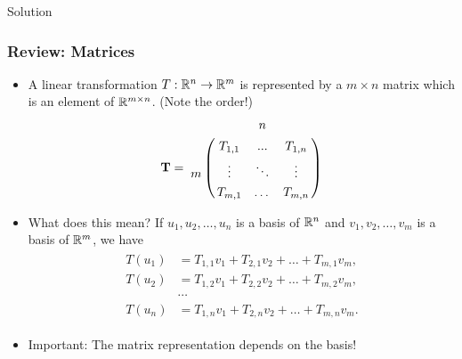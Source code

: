 \documentclass{beamer}
\begin{document}
\begin{frame}[t]{Solution}
	\grid
	\pause
	\pause
\end{frame}

\begin{frame}[t]
	\frametitle{Review: Matrices}
	\begin{itemize}
	\fonttwelve
\item A linear transformation $ T: \mathbb{R}^n \to \mathbb{R}^m$ is represented by a $m \times n $ matrix
which is an element of $\mathbb{R}^{m\times n}$. (Note the order!)\begin{align*}
\mathbf{T} = \bordermatrix{ &  & n &  \cr
       & T_{1,1} & ... & T_{1,n} \cr
      m & \vdots & \ddots & \vdots \cr
       & T_{m,1} & \dots & T_{m,n} }
\end{align*}
\item What does this mean? If $u_1, u_2, \dots, u_n$ is a basis of $\mathbb{R}^n$ and $v_1, v_2, \dots, v_m$ is a basis of $\mathbb{R}^m$, we have
\begin{align*}
\begin{split}
T(u_1) &= T_{1,1} v_1 + T_{2,1} v_2 + \dots + T_{m,1} v_m, \\
T(u_2) &= T_{1,2} v_1 + T_{2,2} v_2 + \dots + T_{m,2} v_m, \\
&\cdots \\
T(u_n) &= T_{1,n} v_1 + T_{2,n} v_2 + \dots + T_{m,n} v_m.
\end{split}
\end{align*}
\item Important: The matrix representation depends on the basis!
\fonttwelve
	\end{itemize}
\end{frame}
\end{document}
